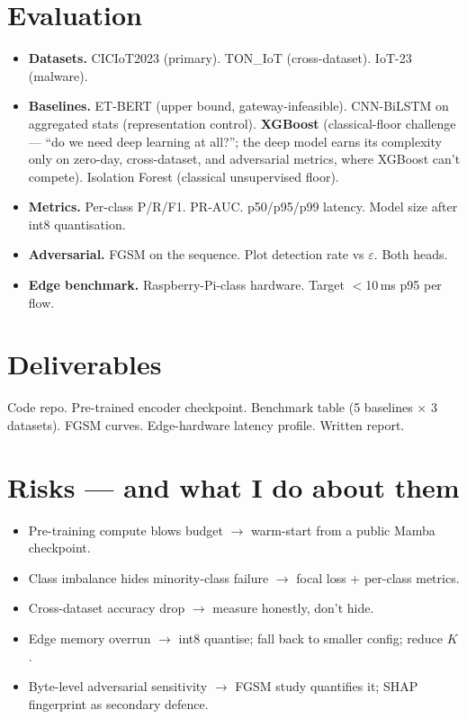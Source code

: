 \documentclass[11pt,a4paper]{article}
\begin{document}
\section{Evaluation}
\begin{itemize}[leftmargin=*, itemsep=1pt, topsep=2pt]
  \item \textbf{Datasets.} CICIoT2023 (primary). TON\_IoT (cross-dataset). IoT-23 (malware).
  \item \textbf{Baselines.} ET-BERT (upper bound, gateway-infeasible). CNN-BiLSTM on aggregated stats (representation control). \textbf{XGBoost} (classical-floor challenge --- ``do we need deep learning at all?''; the deep model earns its complexity only on zero-day, cross-dataset, and adversarial metrics, where XGBoost can't compete). Isolation Forest (classical unsupervised floor).
  \item \textbf{Metrics.} Per-class P/R/F1. PR-AUC. p50/p95/p99 latency. Model size after int8 quantisation.
  \item \textbf{Adversarial.} FGSM on the sequence. Plot detection rate vs $\varepsilon$. Both heads.
  \item \textbf{Edge benchmark.} Raspberry-Pi-class hardware. Target $<$10\,ms p95 per flow.
\end{itemize}

\section{Deliverables}
Code repo. Pre-trained encoder checkpoint. Benchmark table (5 baselines $\times$ 3 datasets). FGSM curves. Edge-hardware latency profile. Written report.

\section{Risks --- and what I do about them}
\begin{itemize}[leftmargin=*, itemsep=1pt, topsep=2pt]
  \item Pre-training compute blows budget $\to$ warm-start from a public Mamba checkpoint.
  \item Class imbalance hides minority-class failure $\to$ focal loss + per-class metrics.
  \item Cross-dataset accuracy drop $\to$ measure honestly, don't hide.
  \item Edge memory overrun $\to$ int8 quantise; fall back to smaller config; reduce $K$.
  \item Byte-level adversarial sensitivity $\to$ FGSM study quantifies it; SHAP fingerprint as secondary defence.
\end{itemize}
\end{document}
